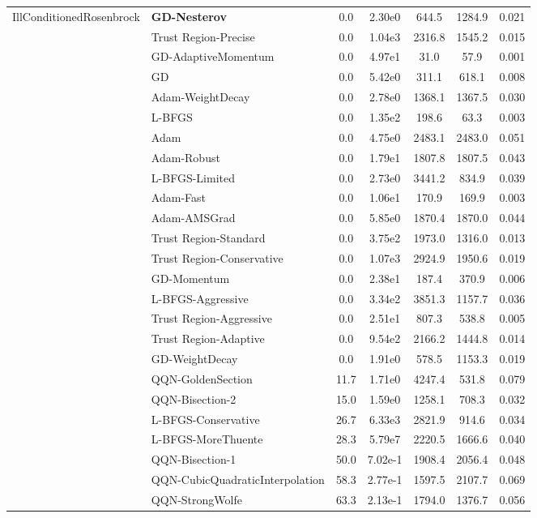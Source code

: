 \documentclass{article}
\begin{document}
\begin{table}[htbp]
{\begin{tabular}{p{2.5cm}p{2.5cm}*{5}{c}}
\midrule
\multirow{25}{*}{IllConditionedRosenbrock} & \textbf{GD-Nesterov} & 0.0 & 2.30e0 & 644.5 & 1284.9 & 0.021 \\
 & Trust Region-Precise & 0.0 & 1.04e3 & 2316.8 & 1545.2 & 0.015 \\
 & GD-AdaptiveMomentum & 0.0 & 4.97e1 & 31.0 & 57.9 & 0.001 \\
 & GD & 0.0 & 5.42e0 & 311.1 & 618.1 & 0.008 \\
 & Adam-WeightDecay & 0.0 & 2.78e0 & 1368.1 & 1367.5 & 0.030 \\
 & L-BFGS & 0.0 & 1.35e2 & 198.6 & 63.3 & 0.003 \\
 & Adam & 0.0 & 4.75e0 & 2483.1 & 2483.0 & 0.051 \\
 & Adam-Robust & 0.0 & 1.79e1 & 1807.8 & 1807.5 & 0.043 \\
 & L-BFGS-Limited & 0.0 & 2.73e0 & 3441.2 & 834.9 & 0.039 \\
 & Adam-Fast & 0.0 & 1.06e1 & 170.9 & 169.9 & 0.003 \\
 & Adam-AMSGrad & 0.0 & 5.85e0 & 1870.4 & 1870.0 & 0.044 \\
 & Trust Region-Standard & 0.0 & 3.75e2 & 1973.0 & 1316.0 & 0.013 \\
 & Trust Region-Conservative & 0.0 & 1.07e3 & 2924.9 & 1950.6 & 0.019 \\
 & GD-Momentum & 0.0 & 2.38e1 & 187.4 & 370.9 & 0.006 \\
 & L-BFGS-Aggressive & 0.0 & 3.34e2 & 3851.3 & 1157.7 & 0.036 \\
 & Trust Region-Aggressive & 0.0 & 2.51e1 & 807.3 & 538.8 & 0.005 \\
 & Trust Region-Adaptive & 0.0 & 9.54e2 & 2166.2 & 1444.8 & 0.014 \\
 & GD-WeightDecay & 0.0 & 1.91e0 & 578.5 & 1153.3 & 0.019 \\
 & QQN-GoldenSection & 11.7 & 1.71e0 & 4247.4 & 531.8 & 0.079 \\
 & QQN-Bisection-2 & 15.0 & 1.59e0 & 1258.1 & 708.3 & 0.032 \\
 & L-BFGS-Conservative & 26.7 & 6.33e3 & 2821.9 & 914.6 & 0.034 \\
 & L-BFGS-MoreThuente & 28.3 & 5.79e7 & 2220.5 & 1666.6 & 0.040 \\
 & QQN-Bisection-1 & 50.0 & 7.02e-1 & 1908.4 & 2056.4 & 0.048 \\
 & QQN-CubicQuadraticInterpolation & 58.3 & 2.77e-1 & 1597.5 & 2107.7 & 0.069 \\
 & QQN-StrongWolfe & 63.3 & 2.13e-1 & 1794.0 & 1376.7 & 0.056 \\

\end{tabular}}
\end{table}
\end{document}
